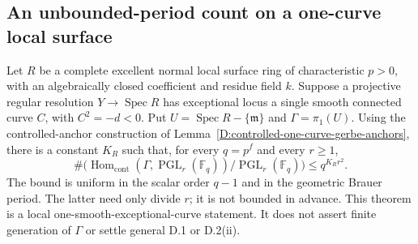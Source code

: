\subsection{An unbounded-period count on a one-curve local surface}

\begin{theorem}
\label{D:one-curve-unbounded-period-projective-count}
Let $R$ be a complete excellent normal local surface ring of
characteristic $p>0$, with an algebraically closed coefficient
and residue field $k$. Suppose a projective regular resolution
$Y\to\operatorname{Spec}R$ has exceptional locus a single
smooth connected curve $C$, with $C^2=-d<0$.
Put $U=\operatorname{Spec}R-\{\mathfrak m\}$ and
$\Gamma=\pi_1(U)$. Using the controlled-anchor construction
of Lemma~\ref{D:controlled-one-curve-gerbe-anchors}, there
is a constant $K_R$ such that, for every $q=p^f$ and
every $r\geq1$,
\[
 \#\bigl(\operatorname{Hom}_{\mathrm{cont}}
       (\Gamma,\operatorname{PGL}_r(\mathbb F_q))
           /\operatorname{PGL}_r(\mathbb F_q)\bigr)
                      \leq q^{K_Rr^2}.                 \tag{D.UP.1}
\]
The bound is uniform in the scalar order $q-1$ and in the
geometric Brauer period. The latter need only divide $r$;
it is not bounded in advance. This theorem is a local
one-smooth-exceptional-curve statement. It does not assert
finite generation of $\Gamma$ or settle general D.1 or D.2(ii).
\end{theorem}

